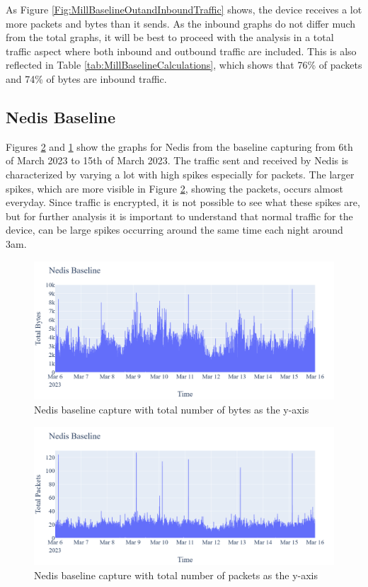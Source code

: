 As Figure \ref{Fig:MillBaselineOutandInboundTraffic} shows, the device receives a lot more packets and bytes than it sends. As the inbound graphs do not differ much from the total graphs, it will be best to proceed with the analysis in a total traffic aspect where both inbound and outbound traffic are included. This is also reflected in Table \ref{tab:MillBaselineCalculations}, which shows that 76\% of packets and 74\% of bytes are inbound traffic.

\subsection{Nedis Baseline}
Figures \ref{fig:NedisBaselineTotalPackets} and \ref{fig:NedisBaselineTotalBytes} show the graphs for Nedis from the baseline capturing from 6th of March 2023 to 15th of March 2023. The traffic sent and received by Nedis is characterized by varying a lot with high spikes especially for packets. The larger spikes, which are more visible in Figure \ref{fig:NedisBaselineTotalPackets}, showing the packets, occurs almost everyday. Since traffic is encrypted, it is not possible to see what these spikes are, but for further analysis it is important to understand that normal traffic for the device, can be large spikes occurring around the same time each night around 3am. 
\begin{figure} [H]
    \centering
    \includegraphics[scale=0.25]{figures/Nedis_Baseline_TotalBytes.png}
    \caption{Nedis baseline capture with total number of bytes as the y-axis}
    \label{fig:NedisBaselineTotalBytes}
\end{figure}

\begin{figure} [H]
    \centering
    \includegraphics[scale=0.25]{figures/Nedis_Baseline_TotalPackets.png}
    \caption{Nedis baseline capture with total number of packets as the y-axis}
    \label{fig:NedisBaselineTotalPackets}
 \end{figure}

